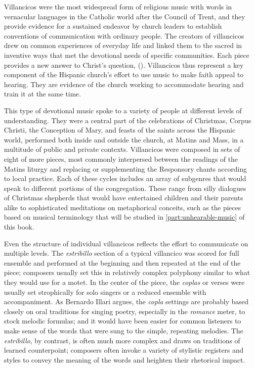 Villancicos were the most widespread form of religious music with words in
vernacular languages in the Catholic world after the Council of Trent, and they
provide evidence for a sustained endeavor by church leaders to establish
conventions of communication with ordinary people.
The creators of villancicos drew on common experiences of everyday life and
linked them to the sacred in inventive ways that met the devotional needs of
specific communities.
Each piece provides a new answer to Christ's question, 
().
Villancicos thus represent a key component of the Hispanic church's effort
to use music to make faith appeal to hearing.
They are evidence of the church working to accommodate hearing and train it at
the same time.

This type of devotional music spoke to a variety of people at different levels
of understanding.
They were a central part of the celebrations of Christmas, Corpus Christi, the
Conception of Mary, and feasts of the saints across the Hispanic world,
performed both inside and outside the church, at Matins and Mass, in a multitude
of public and private contexts.
Villancicos were composed in sets of eight of more pieces, most commonly
interpersed between the readings of the Matins liturgy and replacing or
supplementing the Responsory chants according to local practice.
Each of these cycles includes an array of subgenres that would speak to
different portions of the congregation.
These range from silly dialogues of Christmas shepherds that would have
entertained children and their parents alike to sophisticated meditations on
metaphorical conceits, such as the pieces based on musical terminology that will
be studied in \cref{part:unhearable-music} of this book.

Even the structure of individual villancicos reflects the effort to communicate
on multiple levels.
The \emph{estribillo} section of a typical villancico was scored for full
ensemble and performed at the beginning and then repeated at the end of the
piece; composers usually set this in relatively complex polyphony similar to
what they would use for a motet.
In the center of the piece, the \emph{coplas} or verses were usually set
strophically for solo singers or a reduced ensemble with accompaniment.
As Bernardo Illari argues, the \emph{copla} settings are probably based closely
on oral traditions for singing poetry, especially in the \emph{romance} meter,
to stock melodic formulas; and it would have been easier for common listeners to
make sense of the words that were sung to the simple, repeating melodies.%
    \Autocite{Illari:Polychoral}
The \emph{estribillo}, by contrast, is often much more complex and draws on
traditions of learned counterpoint; composers often invoke a variety of
stylistic registers and styles to convey the meaning of the words and heighten
their rhetorical impact.

